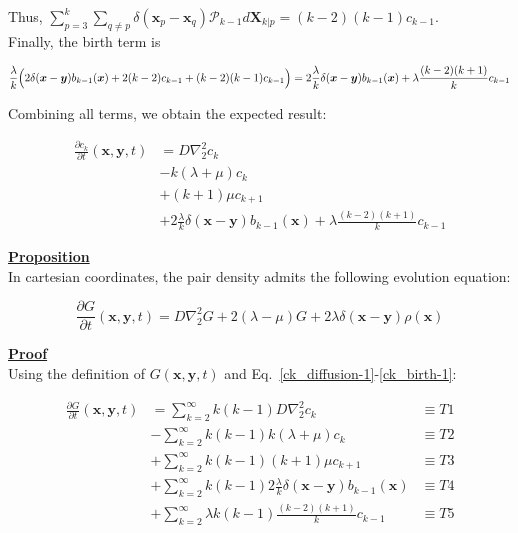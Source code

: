 Thus, $\sum_{p=3}^{k}\sum_{q\neq p}\delta(\boldsymbol{x}_{p}-\boldsymbol{x}_{q})\mathcal{P}_{k-1}d\boldsymbol{X}_{k|p}=(k-2)(k-1)c_{k-1}$.\\

Finally, the birth term is

\begin{equation}
\frac{\lambda}{k}\Bigl(2\delta(\boldsymbol{x}-\boldsymbol{y})b_{k-1}(\boldsymbol{x})+2(k-2)c_{k-1}+(k-2)(k-1)c_{k-1}\Bigr)=2\frac{\lambda}{k}\delta(\boldsymbol{x}-\boldsymbol{y})b_{k-1}(\boldsymbol{x})+\lambda\frac{(k-2)(k+1)}{k}c_{k-1}
\end{equation}

Combining all terms, we obtain the expected result:

\begin{subequations} 
\begin{align}
\frac{\partial c_{k}}{\partial t}(\boldsymbol{x},\boldsymbol{y},t) & =D\nabla_{2}^{2}c_{k}\label{ck_diffusion-2}\\
 & -k(\lambda+\mu)c_{k}\label{ck_same_state-2}\\
 & +(k+1)\mu c_{k+1}\label{ck_death-2}\\
 & +2\frac{\lambda}{k}\delta(\boldsymbol{x}-\boldsymbol{y})b_{k-1}(\boldsymbol{x})+\lambda\frac{(k-2)(k+1)}{k}c_{k-1}\label{ck_birth-2}
\end{align}
\end{subequations}

\textbf{\underline{Proposition}}\\

In cartesian coordinates, the pair density admits the following evolution equation:

\begin{equation} 
\frac{\partial G}{\partial t}(\boldsymbol{x},\boldsymbol{y},t) =D\nabla_{2}^{2}G +2(\lambda-\mu)G + 2\lambda\delta(\boldsymbol{x}-\boldsymbol{y})\rho(\boldsymbol{x})
\end{equation}

\vspace{2em}

\textbf{\underline{Proof}}\\ 

Using the definition of $G(\boldsymbol{x},\boldsymbol{y},t)$ and Eq.~\ref{ck_diffusion-1}-\ref{ck_birth-1}:

\begin{subequations} 
\begin{align}
\frac{\partial G}{\partial t}(\boldsymbol{x},\boldsymbol{y},t) & =\sum_{k=2}^{\infty}k(k-1)D\nabla_{2}^{2}c_{k} & \equiv T1\label{nk_diffusion}\\
 & -\sum_{k=2}^{\infty}k(k-1)k(\lambda+\mu)c_{k} & \equiv T2\label{nk_same_state}\\
 & +\sum_{k=2}^{\infty}k(k-1)(k+1)\mu c_{k+1} & \equiv T3\label{nk_death}\\
 & +\sum_{k=2}^{\infty}k(k-1)2\frac{\lambda}{k}\delta(\boldsymbol{x}-\boldsymbol{y})b_{k-1}(\boldsymbol{x}) & \equiv T4\label{nk_birth}\\
 & +\sum_{k=2}^{\infty}\lambda k(k-1)\frac{(k-2)(k+1)}{k}c_{k-1} & \equiv T5\label{eq:nk_birth2}
\end{align}
\end{subequations}

